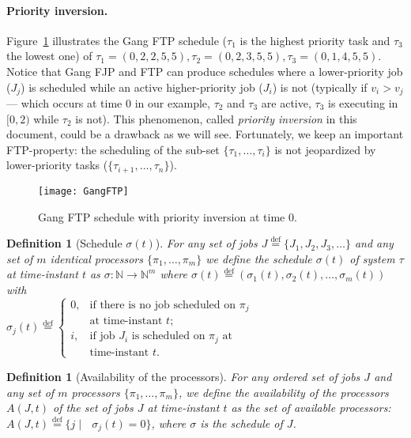 \documentclass[a4paper]{article}
\newtheorem{definition}[theorem]{Definition}
\newcommand{\equals}{\stackrel{\mathrm{def}}{=}}
\begin{document}
\paragraph{Priority inversion.} Figure~\ref{fig:gangftp} illustrates the Gang FTP schedule ($\tau_{1} $ is the highest priority task and $\tau_{3}$ the lowest one) of $\tau_{1} = (0,2,2,5,5), \tau_{2} = (0,2,3,5,5), \tau_{3} = (0,1,4,5,5)$. Notice that Gang FJP and FTP can produce schedules where a lower-priority job ($J_{j}$) is scheduled while an active higher-priority job ($J_{i}$) is not (typically if $v_{i}>v_{j}$ --- which occurs at time $0$ in our example, $\tau_{2}$ and $\tau_{3}$ are active, $\tau_{3}$ is executing in $[0,2)$ while $\tau_{2}$ is not). This phenomenon, called \emph{priority inversion} in this document, could be a drawback as we will see. Fortunately, we keep an important FTP-property: the scheduling of the sub-set $\{\tau_{1}, \ldots, \tau_{i}\}$ is not jeopardized by lower-priority tasks ($\{\tau_{i+1}, \ldots, \tau_{n}\}$).

\begin{figure}
\begin{center}
\texttt{[image: GangFTP]}
\caption{\label{fig:gangftp}Gang FTP schedule with priority inversion at time $0$.} 
\end{center}\end{figure}

\begin{definition}[Schedule $\sigma(t)$]\label{def:sched}
  For any set of jobs $J \equals \{J_{1}, J_{2}, J_{3},\ldots\}$ and any set of $m$ identical processors $\{\pi_1, \ldots, \pi_m \}$ we define the \emph{schedule} $\sigma(t)$ of system $\tau $ at time-instant $t$ as
  $\sigma : \mathbb{N} \rightarrow \mathbb{N}^m$ where $\sigma(t) \equals (\sigma_1(t),
  \sigma_2(t), \ldots,
  \sigma_m(t))$ with \\
  $\sigma_j(t) \equals \left\{
\begin{array}{ll}
0, & \text{if there is no job scheduled on } \pi_j \\
& \text{at time-instant } t; \\
i, & \text{if job } J_i \mbox{ is scheduled on } \pi_j \text{ at}\\
& \text{time-instant } t.  
\end{array}
\right.$
\end{definition}
\begin{definition}[Availability of the processors]\label{def:avaiJob}
For any ordered set of jobs $J$ and any set of $m$ processors $\{\pi_1, \ldots, \pi_m \}$, we define the {\em availability of the processors} $A(J,t)$ of the set of jobs $J$ at time-instant $t$ as the set of available processors: $A(J,t) \equals \{j \mid \mbox{ } \sigma_j(t)=0 \}$, where $\sigma$ is the schedule of $J$.
\end{definition}
\end{document}
